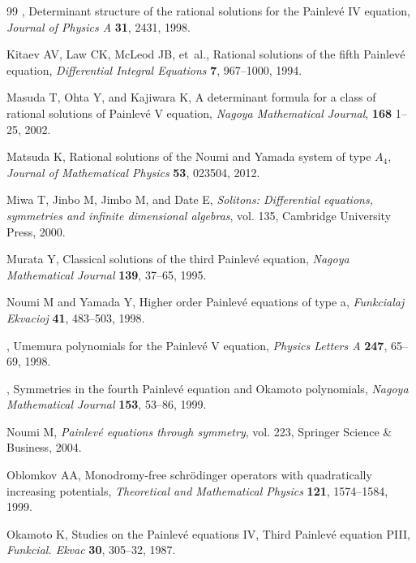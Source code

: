 \documentclass{amsart}
\theoremstyle{definition}
\begin{document}
\begin{thebibliography}{99}
\bysame, {Determinant structure of
    the rational solutions for the Painlev{\'e} IV equation},
  \textit{Journal of Physics A} \textbf{31}, 2431, 1998.

Kitaev AV, Law CK, McLeod JB, et~al.,
  {Rational solutions of the fifth Painlev{\'e} equation},
  \textit{Differential Integral Equations} \textbf{7}, 967--1000,
  1994.

 Masuda T, Ohta Y, and Kajiwara K, {A
    determinant formula for a class of rational solutions of
    Painlev{\'e} V equation}, \textit{Nagoya Mathematical Journal},
  \textbf{168} 1--25, 2002.

 Matsuda K, {Rational solutions of the
    Noumi and Yamada system of type $A_4$}, \textit{Journal of
    Mathematical Physics} \textbf{53}, 023504, 2012.

Miwa T,  Jinbo M, Jimbo  M,
and Date E, \textit{Solitons: Differential equations, symmetries and infinite
dimensional algebras}, vol.  135, Cambridge University Press, 2000.

 Murata Y, {Classical solutions of the
    third Painlev{\'e} equation}, \textit{Nagoya Mathematical Journal}
  \textbf{139}, 37--65, 1995.

 Noumi M and Yamada Y, {Higher order
    Painlev{\'e} equations of type a}, \textit{Funkcialaj Ekvacioj}
  \textbf{41}, 483--503, 1998.

 \bysame, {Umemura polynomials for the
    Painlev{\'e} V equation}, \textit{Physics Letters A} \textbf{247},
  65--69, 1998.

 \bysame, {Symmetries in the fourth
    Painlev{\'e} equation and Okamoto polynomials}, \textit{Nagoya
    Mathematical Journal} \textbf{153}, 53--86, 1999.

 Noumi M, \textit{Painlev{\'e} equations
through symmetry}, vol. 223, Springer Science \& Business, 2004.

Oblomkov AA, {Monodromy-free
    schr{\"o}dinger operators with quadratically increasing
    potentials}, \textit{Theoretical and Mathematical Physics}
  \textbf{121}, 1574--1584, 1999.

 Okamoto K, {Studies on the Painlev{\'e}
    equations IV}, Third Painlev{\'e} equation PIII,
  \textit{Funkcial. Ekvac} \textbf{30}, 305--32, 1987.


\end{thebibliography}
\end{document}

